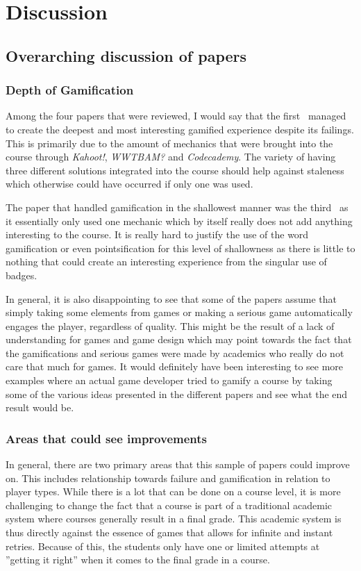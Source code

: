 \section{Discussion}

\subsection{Overarching discussion of papers}
\subsubsection{Depth of Gamification}
Among the four papers that were reviewed, I would say that the first~\cite{panagiotis2016climbing} managed to create the deepest and most interesting gamified experience despite its failings. This is primarily due to the amount of mechanics that were brought into the course through \emph{Kahoot!}, \emph{WWTBAM?} and \emph{Codecademy}. The variety of having three different solutions integrated into the course should help against staleness which otherwise could have occurred if only one was used. 

The paper that handled gamification in the shallowest manner was the third~\cite{ortiz2017gamification} as it essentially only used one mechanic which by itself really does not add anything interesting to the course. It is really hard to justify the use of the word gamification or even pointsification for this level of shallowness as there is little to nothing that could create an interesting experience from the singular use of badges. 

In general, it is also disappointing to see that some of the papers assume that simply taking some elements from games or making a serious game automatically engages the player, regardless of quality. This might be the result of a lack of understanding for games and game design which may point towards the fact that the gamifications and serious games were made by academics who really do not care that much for games. It would definitely have been interesting to see more examples where an actual game developer tried to gamify a course by taking some of the various ideas presented in the different papers and see what the end result would be. 

\subsubsection{Areas that could see improvements}
In general, there are two primary areas that this sample of papers could improve on. This includes relationship towards failure and gamification in relation to player types. 
While there is a lot that can be done on a course level, it is more challenging to change the fact that a course is part of a traditional academic system where courses generally result in a final grade. This academic system is thus directly against the essence of games that allows for infinite and instant retries. Because of this, the students only have one or limited attempts at ''getting it right'' when it comes to the final grade in a course. 

